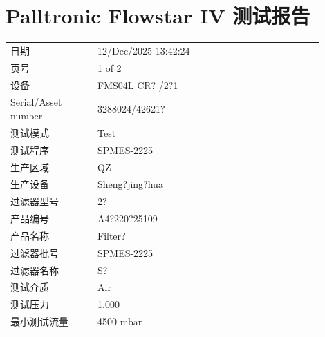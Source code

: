 \documentclass[UTF8,10pt,a4paper,fontset=fandol]{ctexart}
\newcommand{\fieldvalue}[1]{#1}
\begin{document}
\newpage

\section*{Palltronic Flowstar IV 测试报告}

\begin{tabular}{@{}p{0.25\linewidth}p{0.65\linewidth}@{}}
日期 &
\fieldvalue{12/Dec/2025 13:42:24}
\\
页号 & 1 of 2 \\
设备 &
\fieldvalue{FMS04L CR? /2?1}
\\
Serial/Asset number &
\fieldvalue{3288024/42621?}
\\
测试模式 &
\fieldvalue{Test}
\\
测试程序 &
\fieldvalue{SPMES-2225}
\\
生产区域 &
\fieldvalue{QZ}
\\
生产设备 &
\fieldvalue{Sheng?jing?hua}
\\
过滤器型号 &
\fieldvalue{2?}
\\
产品编号 &
\fieldvalue{A4?220?25109}
\\
产品名称 &
\fieldvalue{Filter?}
\\
过滤器批号 &
\fieldvalue{SPMES-2225}
\\
过滤器名称 &
\fieldvalue{S?}
\\
测试介质 &
\fieldvalue{Air}
\\
测试压力 &
\fieldvalue{1.000}
\\
最小测试流量 &
\fieldvalue{4500 mbar}
\end{tabular}

\vspace{1em}
\end{document}
